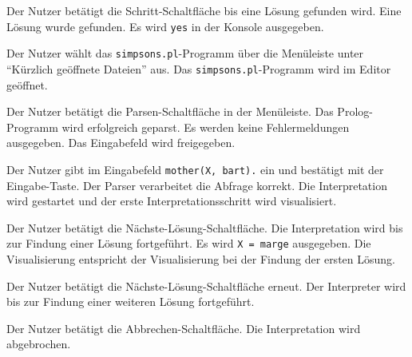 \documentclass[parskip=full,11pt,twoside]{scrartcl}
\begin{document}
{Der Nutzer betätigt die Schritt-Schaltfläche bis eine Lösung gefunden wird.}
{Eine Lösung wurde gefunden. Es wird \texttt{yes} in der Konsole ausgegeben.}


{Der Nutzer wählt das \texttt{simpsons.pl}-Programm über die Menüleiste unter \enquote{Kürzlich geöffnete Dateien} aus.}
{Das \texttt{simpsons.pl}-Programm wird im Editor geöffnet.}

{Der Nutzer betätigt die Parsen-Schaltfläche in der Menüleiste.}
{Das Prolog-Programm wird erfolgreich geparst. Es werden keine Fehlermeldungen ausgegeben. Das Eingabefeld wird freigegeben.}

{Der Nutzer gibt im Eingabefeld \texttt{mother(X, bart).} ein und bestätigt mit der Eingabe-Taste.}
{Der Parser verarbeitet die Abfrage korrekt. Die Interpretation wird gestartet und der erste Interpretationsschritt wird visualisiert.}

{Der Nutzer betätigt die Nächste-Lösung-Schaltfläche.}
{Die Interpretation wird bis zur Findung einer Lösung fortgeführt. Es wird \texttt{X = marge} ausgegeben. Die Visualisierung entspricht der Visualisierung bei der Findung der ersten Lösung.}

{Der Nutzer betätigt die Nächste-Lösung-Schaltfläche erneut.}
{Der Interpreter wird bis zur Findung einer weiteren Lösung fortgeführt.}

{Der Nutzer betätigt die Abbrechen-Schaltfläche.}
{Die Interpretation wird abgebrochen.}
\end{document}
